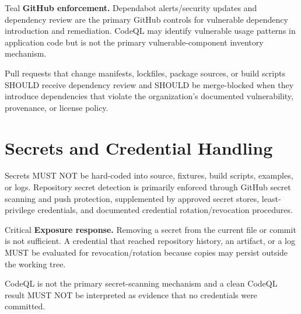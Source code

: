 \documentclass[10pt,letterpaper]{article}
\begin{document}
\begin{callout}{Teal}
\textbf{GitHub enforcement.} Dependabot alerts/security updates and dependency review are the primary GitHub controls for vulnerable dependency introduction and remediation. CodeQL may identify vulnerable usage patterns in application code but is not the primary vulnerable-component inventory mechanism.
\end{callout}

Pull requests that change manifests, lockfiles, package sources, or build scripts SHOULD receive dependency review and SHOULD be merge-blocked when they introduce dependencies that violate the organization's documented vulnerability, provenance, or license policy.

\section{Secrets and Credential Handling}
Secrets MUST NOT be hard-coded into source, fixtures, build scripts, examples, or logs. Repository secret detection is primarily enforced through GitHub secret scanning and push protection, supplemented by approved secret stores, least-privilege credentials, and documented credential rotation/revocation procedures.

\begin{callout}{Critical}
\textbf{Exposure response.} Removing a secret from the current file or commit is not sufficient. A credential that reached repository history, an artifact, or a log MUST be evaluated for revocation/rotation because copies may persist outside the working tree.
\end{callout}

CodeQL is not the primary secret-scanning mechanism and a clean CodeQL result MUST NOT be interpreted as evidence that no credentials were committed.
\end{document}
